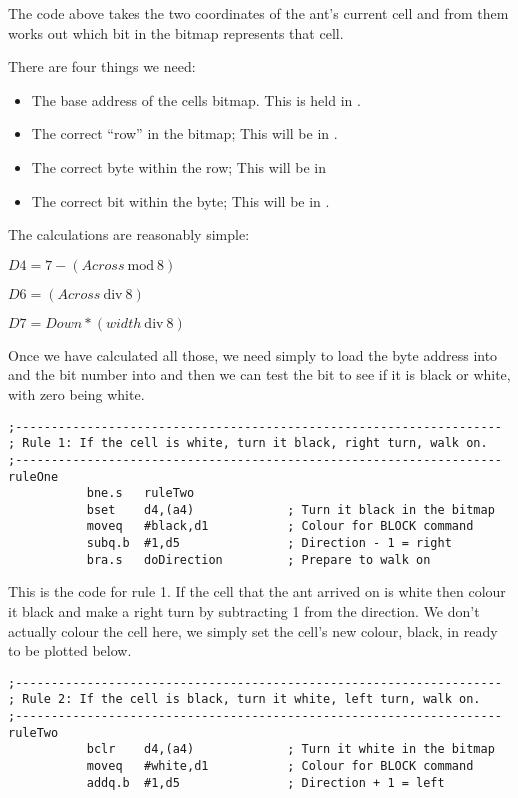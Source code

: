 The code above takes the two coordinates of the ant's current cell and from them works out which bit in the bitmap represents that cell.

There are four things we need:

\begin{itemize}
	\item The base address of the cells bitmap. This is held in .
	\item The correct ``row'' in the bitmap; This will be in .
	\item The correct byte within the row; This will be in 
	\item The correct bit within the byte; This will be in .
\end{itemize}

The calculations are reasonably simple:


$D4 = 7 - (Across~ \text{mod}~ 8)$

$D6 = (Across~ \text{div}~ 8)$

$D7 = Down * (width~ \text{div}~ 8)$

Once we have calculated all those, we need simply to load the byte address into  and the bit number into  and then we can test the bit to see if it is black or white, with zero being white.


\begin{lstlisting}[firstnumber=last,caption={Langtons Ant - Rule 1}]
;--------------------------------------------------------------------
; Rule 1: If the cell is white, turn it black, right turn, walk on.
;--------------------------------------------------------------------
ruleOne
           bne.s   ruleTwo
           bset    d4,(a4)             ; Turn it black in the bitmap
           moveq   #black,d1           ; Colour for BLOCK command
           subq.b  #1,d5               ; Direction - 1 = right
           bra.s   doDirection         ; Prepare to walk on

\end{lstlisting}

This is the code for rule 1. If the cell that the ant arrived on is white then colour it black and make a right turn by subtracting 1 from the direction. We don't actually colour the cell here, we simply set the cell's new colour, black, in  ready to be plotted below.

\begin{lstlisting}[firstnumber=last,caption={Langtons Ant - Rule 2}]
;--------------------------------------------------------------------
; Rule 2: If the cell is black, turn it white, left turn, walk on.
;--------------------------------------------------------------------
ruleTwo
           bclr    d4,(a4)             ; Turn it white in the bitmap
           moveq   #white,d1           ; Colour for BLOCK command
           addq.b  #1,d5               ; Direction + 1 = left

\end{lstlisting}

